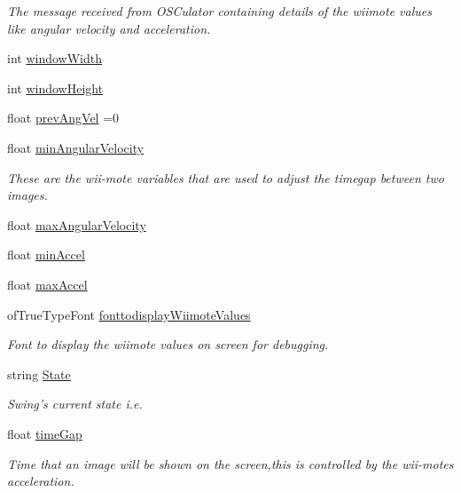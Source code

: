 \begin{DoxyCompactItemize}
\begin{DoxyCompactList}\small\item\em The message received from O\-S\-Culator containing details of the wiimote values like angular velocity and acceleration. \end{DoxyCompactList}\item 
int \hyperlink{group___wii_mote_ga9ed611377cd46f5148a3a3d538e96484}{window\-Width}
\item 
int \hyperlink{group___wii_mote_ga4e8884eeef5b2657b62278969d4e3dcf}{window\-Height}
\item 
float \hyperlink{group___wii_mote_ga8a2b9b9cf76097e20f148b616297029b}{prev\-Ang\-Vel} =0
\item 
float \hyperlink{classtest_app_ac559756a01e0b98378bc29dfba9fac79}{min\-Angular\-Velocity}
\begin{DoxyCompactList}\small\item\em These are the wii-\/mote variables that are used to adjust the timegap between two images. \end{DoxyCompactList}\item 
float \hyperlink{classtest_app_ab9565e8e6dc748ef68e6845f5f94cae9}{max\-Angular\-Velocity}
\item 
float \hyperlink{classtest_app_ab007edbc20b09d607f8010e2dbafdb97}{min\-Accel}
\item 
float \hyperlink{classtest_app_a34e834a5e4d359700147a74eece8eed1}{max\-Accel}
\item 
of\-True\-Type\-Font \hyperlink{classtest_app_ab336e228840f001d15f9b1eb3a30972f}{fonttodisplay\-Wiimote\-Values}
\begin{DoxyCompactList}\small\item\em Font to display the wiimote values on screen for debugging. \end{DoxyCompactList}\item 
string \hyperlink{classtest_app_a8ce5505df4526abed238956b65956edd}{State}
\begin{DoxyCompactList}\small\item\em Swing's current state i.\-e. \end{DoxyCompactList}\item 
float \hyperlink{classtest_app_a944f2713019239a4b49241a5cc9a00c9}{time\-Gap}
\begin{DoxyCompactList}\small\item\em Time that an image will be shown on the screen,this is controlled by the wii-\/motes acceleration. \end{DoxyCompactList}\item 

\end{DoxyCompactItemize}
